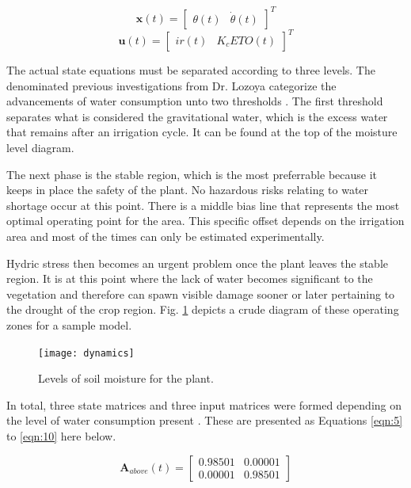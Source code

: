 \documentclass[12pt]{article}
\begin{document}
\begin{equation}
\label{eqn:3}
\mathbf{x}(t) = 
\begin{bmatrix}
\theta(t) & \dot{\theta}(t)
\end{bmatrix}
^T
\end{equation}
\begin{equation}
\label{eqn:4}
\mathbf{u}(t) = 
\begin{bmatrix}
ir(t) & K_c ETO(t)
\end{bmatrix}
^T
\end{equation}

The actual state equations must be separated according to three levels. The denominated previous investigations from Dr. Lozoya categorize the advancements of water consumption unto two thresholds \cite{camilo1}. The first threshold separates what is considered the gravitational water, which is the excess water that remains after an irrigation cycle. It can be found at the top of the moisture level diagram.

The next phase is the stable region, which is the most preferrable because it keeps in place the safety of the plant. No hazardous risks relating to water shortage occur at this point. There is a middle bias line that represents the most optimal operating point for the area. This specific offset depends on the irrigation area and most of the times can only be estimated experimentally.

Hydric stress then becomes an urgent problem once the plant leaves the stable region. It is at this point where the lack of water becomes significant to the vegetation and therefore can spawn visible damage sooner or later pertaining to the drought of the crop region. Fig. \ref{fig:dyn} depicts a crude diagram of these operating zones for a sample model.

\begin{figure}[ht]
\texttt{[image: dynamics]}
\centering
\caption{Levels of soil moisture for the plant.}
\label{fig:dyn}
\end{figure}

In total, three state matrices and three input matrices were formed depending on the level of water consumption present \cite{camilo3}. These are presented as Equations \ref{eqn:5} to \ref{eqn:10} here below.

\begin{equation}
\label{eqn:5}
\mathbf{A}_{above}(t) = 
\begin{bmatrix}
0.98501 & 0.00001 \\
0.00001 & 0.98501
\end{bmatrix}
\end{equation}
\end{document}
